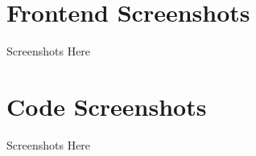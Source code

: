 \section{Frontend Screenshots}
\label{s:Frontend-Screenshots}
Screenshots Here

\section{Code Screenshots}
\label{s:Frontend-Screenshots}
Screenshots Here

